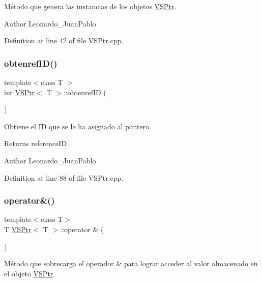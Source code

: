 Método que genera las instancias de los objetos \hyperlink{class_v_s_ptr}{V\+S\+Ptr}. 

\begin{DoxyAuthor}{Author}
Leonardo\+\_\+\+Juan\+Pablo 
\end{DoxyAuthor}


Definition at line 42 of file V\+S\+Ptr.\+cpp.

\mbox{\label{class_v_s_ptr_a915f6d6fd3c35bd6409b21f62284087e}} 
\subsubsection{\texorpdfstring{obtenref\+I\+D()}{obtenrefID()}}
{\footnotesize\ttfamily template$<$class T $>$ \\
int \hyperlink{class_v_s_ptr}{V\+S\+Ptr}$<$ T $>$\+::obtenref\+ID (\begin{DoxyParamCaption}{ }\end{DoxyParamCaption})}



Obtiene el ID que se le ha asignado al puntero. 

\begin{DoxyReturn}{Returns}
reference\+ID 
\end{DoxyReturn}
\begin{DoxyAuthor}{Author}
Leonardo\+\_\+\+Juan\+Pablo 
\end{DoxyAuthor}


Definition at line 88 of file V\+S\+Ptr.\+cpp.

\mbox{\label{class_v_s_ptr_a7d3b2ef1c0ef66d6d3f70cfd39549515}} 
\subsubsection{\texorpdfstring{operator\&()}{operator\&()}}
{\footnotesize\ttfamily template$<$class T$>$ \\
T \hyperlink{class_v_s_ptr}{V\+S\+Ptr}$<$ T $>$\+::operator \& (\begin{DoxyParamCaption}{ }\end{DoxyParamCaption})}



Método que sobrecarga el operador \& para lograr acceder al valor almacenado en el objeto \hyperlink{class_v_s_ptr}{V\+S\+Ptr}. 

